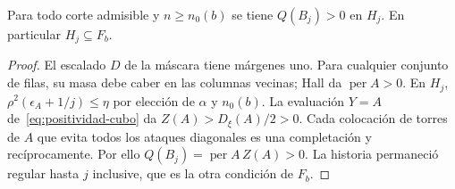 \begin{lema}\label{lem:positividad-llegada}
Para todo corte admisible y \(n\ge n_0(b)\) se tiene \(Q(B_j)>0\) en \(H_j\).
En particular \(H_j\subseteq F_b\).
\end{lema}
\begin{proof}
El escalado \(D\) de la máscara tiene márgenes uno. Para cualquier conjunto de filas,
su masa debe caber en las columnas vecinas; Hall da \(\operatorname{per}A>0\).
En \(H_j\), \(\rho^2(\epsilon_A+1/j)\le\eta\) por elección de \(\alpha\) y \(n_0(b)\).
La evaluación \(Y=A\) de~\eqref{eq:positividad-cubo} da \(Z(A)>D_\xi(A)/2>0\).
Cada colocación de torres de \(A\) que evita todos los ataques diagonales es una
completación y recíprocamente. Por ello \(Q(B_j)=\operatorname{per}A\,Z(A)>0\).
La historia permaneció regular hasta \(j\) inclusive, que es la otra condición de \(F_b\).
\end{proof}
